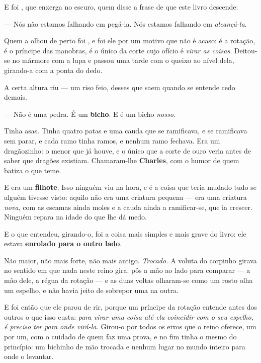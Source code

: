 \documentclass[livro.tex]{subfiles}
\begin{document}
E foi \Drk , que enxerga no escuro, quem disse a frase de que este livro descende:

--- Nós não estamos falhando em pegá-la. Nós estamos falhando em \emph{alcançá-la}.

\medskip

Quem a olhou de perto foi \Joa , e foi ele por um motivo que não é acaso: é a rotação, é o
príncipe das manobras, é o único da corte cujo ofício é \emph{virar as coisas}. Deitou-se no
mármore com a lupa e passou uma tarde com o queixo ao nível dela, girando-a com a ponta do dedo.

A certa altura riu --- um riso feio, desses que saem quando se entende cedo demais.

--- Não é uma pedra. É um \textbf{bicho}. E é um bicho \emph{nosso}.

Tinha asas. Tinha quatro patas e uma cauda que se ramificava, e se ramificava sem parar, e cada
ramo tinha ramos, e nenhum ramo fechava. Era um dragãozinho: o menor que já houve, e o único que
a corte de ouro veria antes de saber que dragões existiam. Chamaram-lhe \textbf{Charles}, com o
humor de quem batiza o que teme.

E era um \textbf{filhote}. Isso ninguém viu na hora, e é a coisa que teria mudado tudo se
alguém tivesse visto: aquilo não era uma criatura pequena --- era uma criatura \emph{nova}, com
as escamas ainda moles e a cauda ainda a ramificar-se, que ia crescer. Ninguém repara na idade
do que lhe dá medo.

\medskip

E o que \Joa entendeu, girando-o, foi a coisa mais simples e mais grave do livro: ele estava
\textbf{enrolado para o outro lado}.

Não maior, não mais forte, não mais antigo. \emph{Trocado.} A voluta do corpinho girava no
sentido em que nada neste reino gira. \Joa pôs a mão ao lado para comparar --- a mão dele, a
régua da rotação --- e as duas voltas olharam-se como um rosto olha um espelho, e não havia jeito
de sobrepor uma na outra.

E foi então que ele parou de rir, porque um príncipe da rotação entende antes dos outros o que
isso custa: \emph{para virar uma coisa até ela coincidir com o seu espelho, é preciso ter para
onde virá-la.} Girou-o por todos os eixos que o reino oferece, um por um, com o cuidado de quem
faz uma prova, e no fim tinha o mesmo do princípio: um bichinho de mão trocada e nenhum lugar no
mundo inteiro para onde o levantar.

\medskip
\end{document}

